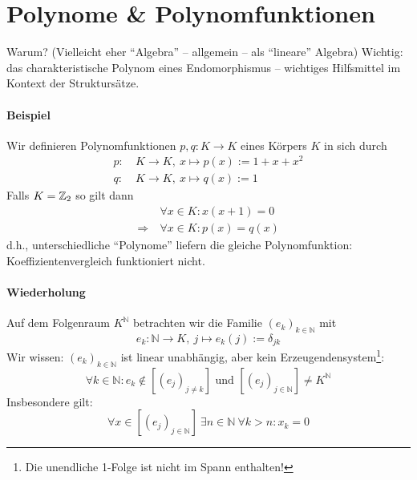 \section{Polynome \& Polynomfunktionen}
	Warum? (Vielleicht eher "`Algebra"' -- allgemein -- als "`lineare"' Algebra) Wichtig: das charakteristische Polynom eines Endomorphismus -- wichtiges Hilfsmittel im Kontext der Struktursätze.
\paragraph{Beispiel}
	Wir definieren Polynomfunktionen $ p,q: K\to K $ eines Körpers $ K $ in sich durch 
		\begin{align*}
		p:\ & K\to K,\ x\mapsto p(x):= 1+x+x^2\\
		q:\ & K\to K,\ x\mapsto q(x):= 1
		\end{align*}
	Falls $ K=\mathbb{Z}_2 $ so gilt dann
		\begin{align*}
		&\forall x\in K: x(x+1)=0\\
		\Rightarrow\ &\forall x\in K: p(x) = q(x)
		\end{align*}
	d.h., unterschiedliche "`Polynome"' liefern die gleiche Polynomfunktion: Koeffizientenvergleich funktioniert nicht.
\paragraph{Wiederholung}
	Auf dem Folgenraum $ K^\mathbb{N} $ betrachten wir die Familie $ (e_k)_{k\in \mathbb{N}} $ mit
		\[ e_k :\mathbb{N}\to K,\ j\mapsto e_k(j):= \delta_{jk} \]
	Wir wissen: $ (e_k)_{k\in \mathbb{N}} $ ist linear unabhängig, aber kein Erzeugendensystem\footnote{Die unendliche 1-Folge ist nicht im Spann enthalten!}:
		\[ \forall k\in \mathbb{N}: e_k \notin [(e_j)_{j\neq k}] \text{ und }
		[(e_j)_{j\in\mathbb{N}}]\neq K^{\mathbb{N}}\]
	Insbesondere gilt:
		\[ \forall x\in [(e_j)_{j\in \mathbb{N}}]\ \exists n\in \mathbb{N}\ \forall k>n : x_k = 0 \]

